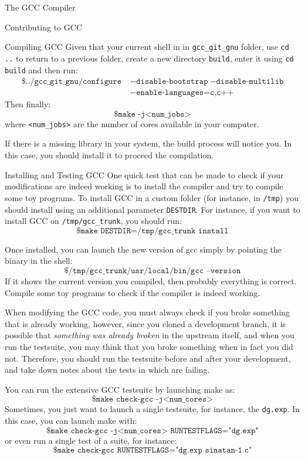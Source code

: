 \begin{section}{The GCC Compiler}
\begin{section}{Contributing to GCC}
\begin{subsection}{Compiling GCC}
Given that your current shell in in \texttt{gcc\_git\_gnu} folder, use \texttt{cd ..}
to return to a previous folder, create a new directory \texttt{build}, enter it
using \texttt{cd build} and then run:
\begin{align}
\texttt{\$ ../gcc\_git\_gnu/configure} & \texttt{ -{}-disable-bootstrap -{}-disable-multilib} \nonumber \\
& \texttt{ -{}-enable-languages=c,c++} \nonumber
\end{align}
Then finally:
$$\texttt{\$ make -j<num\_jobs>}$$
where \texttt{<num\_jobs>} are the number of cores available in your computer.

If there is a missing library in your system, the build process will notice
you. In this case, you should install it to proceed the compilation.
\end{subsection}

\begin{subsection}{Installing and Testing GCC}
One quick test that can be made to check if your modifications are indeed
working is to install the compiler and try to compile some toy programs.
To install GCC in a custom folder (for instance, in \texttt{/tmp}) you
should install using an additional parameter \texttt{DESTDIR}. For instance,
if you want to install GCC on \texttt{/tmp/gcc\_trunk}, you should run:
$$\texttt{\$ make DESTDIR=/tmp/gcc\_trunk install}$$

Once installed, you can launch the new version of gcc simply by pointing
the binary in the shell:
$$\texttt{\$ /tmp/gcc\_trunk/usr/local/bin/gcc --version}$$
If it shows the current version you compiled, then probably everything is
correct. Compile some toy programs to check if the compiler is indeed working.

When modifying the GCC code, you must always check if you broke something
that is already working, however, since you cloned a development branch,
it is possible that \textit{something was already broken} in the upstream
itself, and when you
run the testsuite, you may think that you broke something when in fact
you did not. Therefore, you should run the testsuite before and after your
development, and take down notes about the tests in which are failing.

You can run the extensive GCC testsuite by launching make as:
$$\texttt{\$ make check-gcc -j<num\_cores>}$$
Sometimes, you just want to launch a single testsuite, for instance,
the \texttt{dg.exp}. In this case, you can launch make with:
$$\texttt{\$ make check-gcc -j<num\_cores> RUNTESTFLAGS="dg.exp"}$$
or even run a single test of a suite, for instance:
$$\texttt{\$ make check-gcc RUNTESTFLAGS="dg.exp sinatan-1.c"}$$


\end{subsection}
\end{section}
\end{section}
